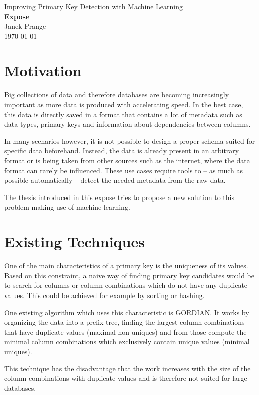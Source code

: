 \documentclass[a4paper]{article}
\begin{document}
\thispagestyle{firstpagestyle}
\begin{center}
  \huge Improving Primary Key Detection with Machine Learning\\[8pt]
  \Large \textbf{Expose}\\[10pt]
  \normalsize Janek Prange\\
  \today
\end{center}

\section{Motivation}
Big collections of data and therefore databases are becoming increasingly important as more data is produced with accelerating speed. In the best case, this data is directly saved in a format that contains a lot of metadata such as data types, primary keys and information about dependencies between columns.

In many scenarios however, it is not possible to design a proper schema suited for specific data beforehand. Instead, the data is already present in an arbitrary format or is being taken from other sources such as the internet, where the data format can rarely be influenced. These use cases require tools to -- as much as possible automatically -- detect the needed metadata from the raw data. %

The thesis introduced in this expose tries to propose a new solution to this problem making use of machine learning.


\section{Existing Techniques}\label{sec:naiveProcedures}
One of the main characteristics of a primary key is the uniqueness of its values. Based on this constraint, a naive way of finding primary key candidates would be to search for columns or column combinations which do not have any duplicate values. This could be achieved for example by sorting or hashing.

One existing algorithm which uses this characteristic is GORDIAN. It works by organizing the data into a prefix tree, finding the largest column combinations that have duplicate values (maximal non-uniques) and from those compute the minimal column combinations which exclusively contain unique values (minimal uniques).

This technique has the disadvantage that the work increases with the size of the column combinations with duplicate values and is therefore not suited for large databases.
\end{document}
